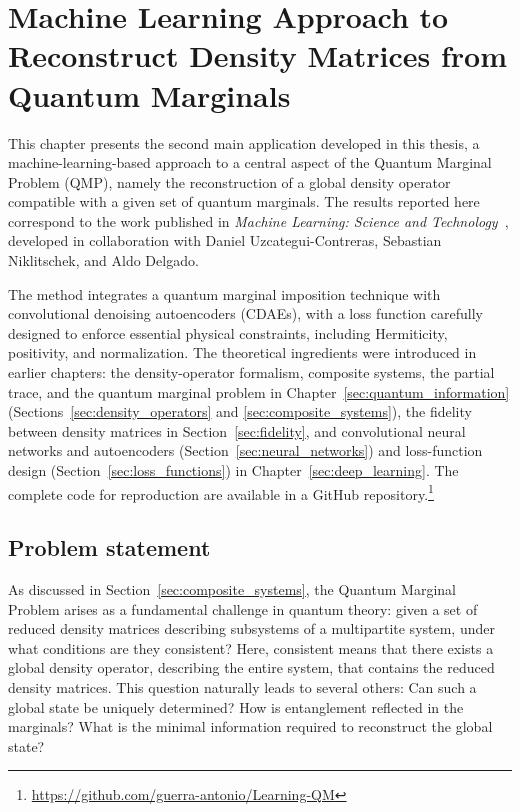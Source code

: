 \chapter{Machine Learning Approach to Reconstruct Density Matrices from Quantum Marginals}
\label{ch:results-qmp}

This chapter presents the second main application developed in this thesis, a machine-learning-based approach to a central aspect of the Quantum Marginal Problem (QMP), namely the reconstruction of a global density operator compatible with a given set of quantum marginals. The results reported here correspond to the work published in \textit{Machine Learning: Science and Technology}~\cite{uzcategui2025marginals}, developed in collaboration with Daniel Uzcategui-Contreras, Sebastian Niklitschek, and Aldo Delgado.

The method integrates a quantum marginal imposition technique with convolutional denoising autoencoders (CDAEs), with a loss function carefully designed to enforce essential physical constraints, including Hermiticity, positivity, and normalization. The theoretical ingredients were introduced in earlier chapters: the density-operator formalism, composite systems, the partial trace, and the quantum marginal problem in Chapter~\ref{sec:quantum_information} (Sections~\ref{sec:density_operators} and \ref{sec:composite_systems}), the fidelity between density matrices in Section~\ref{sec:fidelity}, and convolutional neural networks and autoencoders (Section~\ref{sec:neural_networks}) and loss-function design (Section~\ref{sec:loss_functions}) in Chapter~\ref{sec:deep_learning}. The complete code for reproduction are available in a GitHub repository.\footnote{\url{https://github.com/guerra-antonio/Learning-QM}}

\section{Problem statement}
\label{sec:qmp-problem}

As discussed in Section~\ref{sec:composite_systems}, the Quantum Marginal Problem arises as a fundamental challenge in quantum theory: given a set of reduced density matrices describing subsystems of a multipartite system, under what conditions are they consistent? Here, consistent means that there exists a global density operator, describing the entire system, that contains the reduced density matrices. This question naturally leads to several others: Can such a global state be uniquely determined? How is entanglement reflected in the marginals? What is the minimal information required to reconstruct the global state?

